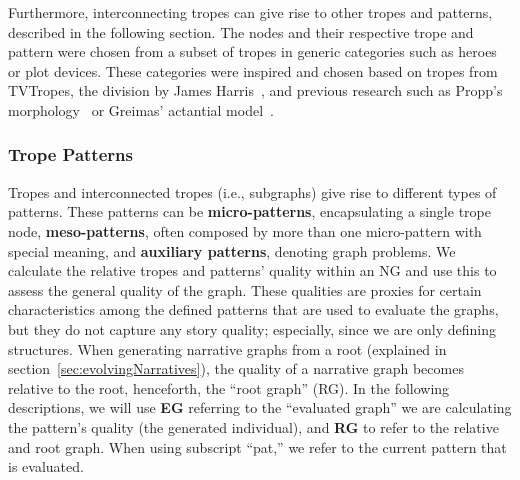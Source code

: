 Furthermore, interconnecting tropes can give rise to other tropes and patterns, described in the following section. The nodes and their respective trope and pattern were chosen from a subset of tropes in generic categories such as heroes or plot devices. These categories were inspired and chosen based on tropes from TVTropes, the division by James Harris~\cite{p12periodicTable}, and previous research such as Propp's morphology~\cite{p12propp1975-morphology} or Greimas' actantial model~\cite{p12Greimas84-structuralSemantics}. 

\subsubsection{Trope Patterns}


Tropes and interconnected tropes (i.e., subgraphs) give rise to different types of patterns. These patterns can be \textbf{micro-patterns}, encapsulating a single trope node, \textbf{meso-patterns}, often composed by more than one micro-pattern with special meaning, and \textbf{auxiliary patterns}, denoting graph problems. We calculate the relative tropes and patterns' quality within an NG and use this to assess the general quality of the graph. These qualities are proxies for certain characteristics among the defined patterns that are used to evaluate the graphs, but they do not capture any story quality; especially, since we are only defining structures. When generating narrative graphs from a root (explained in section~\ref{sec:evolvingNarratives}), the quality of a narrative graph becomes relative to the root, henceforth, the ``root graph'' (RG). In the following descriptions, we will use \textbf{EG} referring to the ``evaluated graph'' we are calculating the pattern's quality (the generated individual), and \textbf{RG} to refer to the relative and root graph. When using subscript ``pat,'' we refer to the current pattern that is evaluated. 


